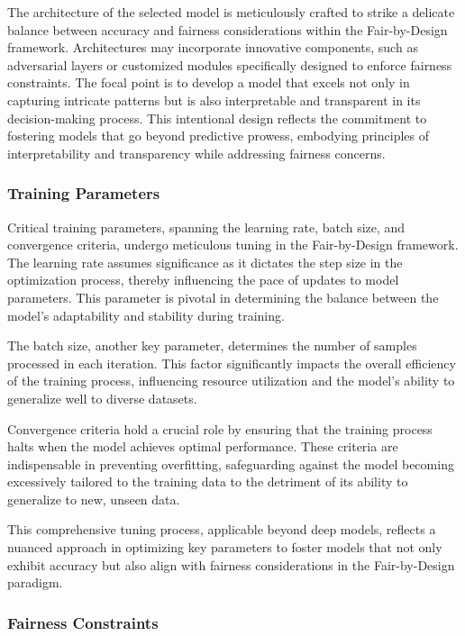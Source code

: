 The architecture of the selected model is meticulously crafted to strike a delicate balance between accuracy and fairness considerations within the Fair-by-Design framework. Architectures may incorporate innovative components, such as adversarial layers or customized modules specifically designed to enforce fairness constraints. The focal point is to develop a model that excels not only in capturing intricate patterns but is also interpretable and transparent in its decision-making process. This intentional design reflects the commitment to fostering models that go beyond predictive prowess, embodying principles of interpretability and transparency while addressing fairness concerns.

\subsubsection{Training Parameters}

Critical training parameters, spanning the learning rate, batch size, and convergence criteria, undergo meticulous tuning in the Fair-by-Design framework. The learning rate assumes significance as it dictates the step size in the optimization process, thereby influencing the pace of updates to model parameters. This parameter is pivotal in determining the balance between the model's adaptability and stability during training.

The batch size, another key parameter, determines the number of samples processed in each iteration. This factor significantly impacts the overall efficiency of the training process, influencing resource utilization and the model's ability to generalize well to diverse datasets.

Convergence criteria hold a crucial role by ensuring that the training process halts when the model achieves optimal performance. These criteria are indispensable in preventing overfitting, safeguarding against the model becoming excessively tailored to the training data to the detriment of its ability to generalize to new, unseen data.

This comprehensive tuning process, applicable beyond deep models, reflects a nuanced approach in optimizing key parameters to foster models that not only exhibit accuracy but also align with fairness considerations in the Fair-by-Design paradigm.

\subsubsection{Fairness Constraints}

